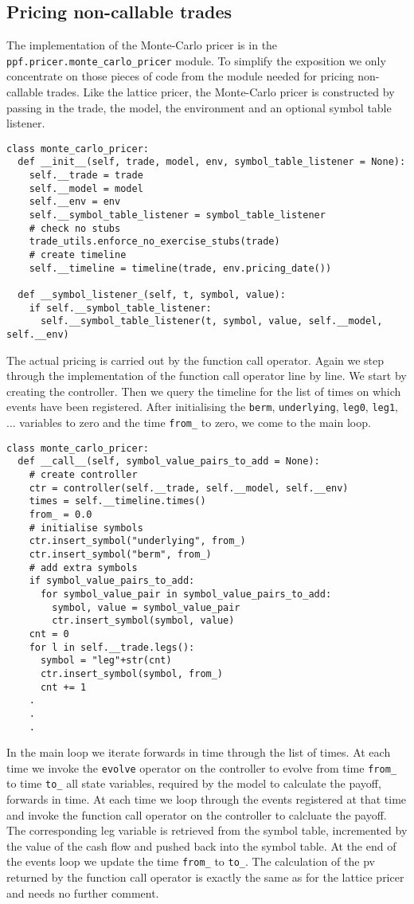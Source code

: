 \subsection{Pricing non-callable trades}
The implementation of the Monte-Carlo pricer is in the
\verb|ppf.pricer.monte_carlo_pricer| module. To simplify the
exposition we only concentrate on those pieces of code from the module
needed for pricing non-callable trades. Like the lattice pricer, the
Monte-Carlo pricer is constructed by passing in the trade, the model,
the environment and an optional symbol table listener. 
\begin{verbatim}
class monte_carlo_pricer:
  def __init__(self, trade, model, env, symbol_table_listener = None):
    self.__trade = trade
    self.__model = model
    self.__env = env
    self.__symbol_table_listener = symbol_table_listener
    # check no stubs
    trade_utils.enforce_no_exercise_stubs(trade)
    # create timeline
    self.__timeline = timeline(trade, env.pricing_date())   

  def __symbol_listener_(self, t, symbol, value):
    if self.__symbol_table_listener:
      self.__symbol_table_listener(t, symbol, value, self.__model, self.__env)
\end{verbatim}
The actual pricing is carried out by the function call operator. Again we step
through the implementation of the function call operator line by
line. We start by creating the controller. Then we query the timeline
for the list of times on which events have been registered. After
initialising the \verb|berm|, \verb|underlying|, \verb|leg0|,
\verb|leg1|, ... variables to zero and the time \verb|from_| to zero,
we come to the main loop. 
\begin{verbatim}
class monte_carlo_pricer:
  def __call__(self, symbol_value_pairs_to_add = None):
    # create controller
    ctr = controller(self.__trade, self.__model, self.__env)
    times = self.__timeline.times()
    from_ = 0.0
    # initialise symbols
    ctr.insert_symbol("underlying", from_)
    ctr.insert_symbol("berm", from_)
    # add extra symbols
    if symbol_value_pairs_to_add:
      for symbol_value_pair in symbol_value_pairs_to_add:
        symbol, value = symbol_value_pair
        ctr.insert_symbol(symbol, value)
    cnt = 0
    for l in self.__trade.legs():
      symbol = "leg"+str(cnt)
      ctr.insert_symbol(symbol, from_)      
      cnt += 1
    .
    .
    .
\end{verbatim}
In the main loop we iterate forwards in time
through the list of times. At each time we invoke the \verb|evolve|
operator on the controller to evolve from time \verb|from_| to time
\verb|to_| all state variables, required by the model to calculate the
payoff, forwards in time. At each time we loop through the events
registered at that time and invoke the function call operator on the
controller to calcluate the payoff. The corresponding leg variable is
retrieved from the symbol table, incremented by the value of the cash
flow and pushed back into the symbol table. At the end of the events
loop we update the time \verb|from_| to \verb|to_|. The calculation of
the pv returned by the function call operator is exactly the same as
for the lattice pricer and needs no further comment.

